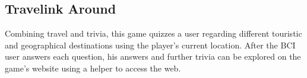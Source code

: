\subsection{Travelink Around}
Combining travel and trivia, this game quizzes a user regarding different touristic and geographical destinations using the player's current location. After the BCI user answers each question, his answers and further trivia can be explored on the game's website using a helper to access the web.

